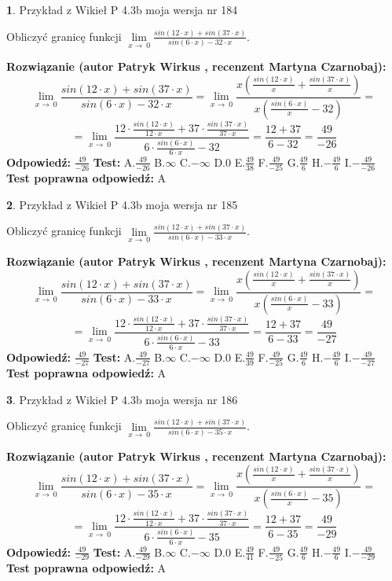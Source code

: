\documentclass[12pt, a4paper]{article}
\theoremstyle{definition} %
\newtheorem{zad}{}
\newcommand{\zadStart}[1]{\begin{zad}#1\newline}
\newcommand{\zadStop}{\end{zad}}
\newcommand{\rozwStart}[2]{\noindent \textbf{Rozwiązanie (autor #1 , recenzent #2): }\newline}
\newcommand{\rozwStop}{\newline}
\newcommand{\odpStart}{\noindent \textbf{Odpowiedź:}\newline}
\newcommand{\odpStop}{\newline}
\newcommand{\testStart}{\noindent \textbf{Test:}\newline}
\newcommand{\testStop}{\newline}
\newcommand{\kluczStart}{\noindent \textbf{Test poprawna odpowiedź:}\newline}
\newcommand{\kluczStop}{\newline}
\begin{document}
\zadStart{Przykład z Wikieł P 4.3b moja wersja nr 184}


Obliczyć granicę funkcji $\lim\limits_{x\to\ 0}\frac{sin(12 \cdot x)+sin(37 \cdot x)}{sin(6 \cdot x)-32 \cdot x}$.
\zadStop
\rozwStart{Patryk Wirkus}{Martyna Czarnobaj}
$$\lim\limits_{x\to\ 0}\frac{sin(12 \cdot x)+sin(37 \cdot x)}{sin(6 \cdot x)-32 \cdot x}=\lim\limits_{x\to\ 0}\frac{x(\frac{sin(12 \cdot x)}{x}+\frac{sin(37 \cdot x)}{x})}{x(\frac{sin(6 \cdot x)}{x}-32)}=$$
$$=\lim\limits_{x\to\ 0}\frac{12 \cdot \frac{sin(12 \cdot x)}{12 \cdot x}+37 \cdot \frac{sin(37 \cdot x)}{37 \cdot x}}{6 \cdot \frac{sin(6 \cdot x)}{6 \cdot x}-32}=\frac{12+37}{6-32} = \frac{49}{-26}$$
\rozwStop
\odpStart
$\frac{49}{-26}$
\odpStop
\testStart
A.$\frac{49}{-26}$
B.$\infty$
C.$-\infty$
D.$0$
E.$\frac{49}{38}$
F.$\frac{49}{-25}$
G.$\frac{49}{6}$
H.$-\frac{49}{6}$
I.$-\frac{49}{-26}$
\testStop
\kluczStart
A
\kluczStop



\zadStart{Przykład z Wikieł P 4.3b moja wersja nr 185}


Obliczyć granicę funkcji $\lim\limits_{x\to\ 0}\frac{sin(12 \cdot x)+sin(37 \cdot x)}{sin(6 \cdot x)-33 \cdot x}$.
\zadStop
\rozwStart{Patryk Wirkus}{Martyna Czarnobaj}
$$\lim\limits_{x\to\ 0}\frac{sin(12 \cdot x)+sin(37 \cdot x)}{sin(6 \cdot x)-33 \cdot x}=\lim\limits_{x\to\ 0}\frac{x(\frac{sin(12 \cdot x)}{x}+\frac{sin(37 \cdot x)}{x})}{x(\frac{sin(6 \cdot x)}{x}-33)}=$$
$$=\lim\limits_{x\to\ 0}\frac{12 \cdot \frac{sin(12 \cdot x)}{12 \cdot x}+37 \cdot \frac{sin(37 \cdot x)}{37 \cdot x}}{6 \cdot \frac{sin(6 \cdot x)}{6 \cdot x}-33}=\frac{12+37}{6-33} = \frac{49}{-27}$$
\rozwStop
\odpStart
$\frac{49}{-27}$
\odpStop
\testStart
A.$\frac{49}{-27}$
B.$\infty$
C.$-\infty$
D.$0$
E.$\frac{49}{39}$
F.$\frac{49}{-25}$
G.$\frac{49}{6}$
H.$-\frac{49}{6}$
I.$-\frac{49}{-27}$
\testStop
\kluczStart
A
\kluczStop



\zadStart{Przykład z Wikieł P 4.3b moja wersja nr 186}


Obliczyć granicę funkcji $\lim\limits_{x\to\ 0}\frac{sin(12 \cdot x)+sin(37 \cdot x)}{sin(6 \cdot x)-35 \cdot x}$.
\zadStop
\rozwStart{Patryk Wirkus}{Martyna Czarnobaj}
$$\lim\limits_{x\to\ 0}\frac{sin(12 \cdot x)+sin(37 \cdot x)}{sin(6 \cdot x)-35 \cdot x}=\lim\limits_{x\to\ 0}\frac{x(\frac{sin(12 \cdot x)}{x}+\frac{sin(37 \cdot x)}{x})}{x(\frac{sin(6 \cdot x)}{x}-35)}=$$
$$=\lim\limits_{x\to\ 0}\frac{12 \cdot \frac{sin(12 \cdot x)}{12 \cdot x}+37 \cdot \frac{sin(37 \cdot x)}{37 \cdot x}}{6 \cdot \frac{sin(6 \cdot x)}{6 \cdot x}-35}=\frac{12+37}{6-35} = \frac{49}{-29}$$
\rozwStop
\odpStart
$\frac{49}{-29}$
\odpStop
\testStart
A.$\frac{49}{-29}$
B.$\infty$
C.$-\infty$
D.$0$
E.$\frac{49}{41}$
F.$\frac{49}{-25}$
G.$\frac{49}{6}$
H.$-\frac{49}{6}$
I.$-\frac{49}{-29}$
\testStop
\kluczStart
A
\kluczStop
\end{document}
